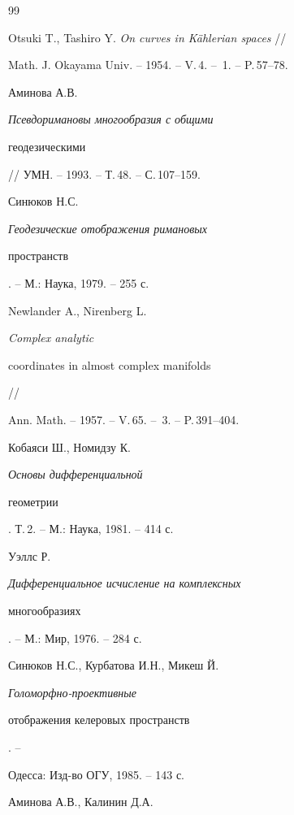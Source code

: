 \begin{thebibliography}{99}


Otsuki T., Tashiro Y. {\em On curves in K\"ahlerian spaces} //


Math. J. Okayama Univ. -- 1954. -- V.\,4. -- \No\,1. -- P.\,57--78.







Аминова А.В. {\em Псевдоримановы многообразия с общими


геодезическими} // УМН. -- 1993. -- Т.\,48. -- С.\,107--159.







Синюков Н.С. {\em Геодезические отображения римановых


пространств}. -- М.: Наука, 1979. -- 255 с.







Newlander A., Nirenberg L. {\em Complex analytic


coordinates in almost complex manifolds} //


Ann. Math. -- 1957. -- V.\,65. -- \No\,3. -- P.\,391--404.







Кобаяси Ш., Номидзу К. {\em Основы дифференциальной


геометрии}. Т.\,2. -- М.: Наука, 1981. -- 414 с.







Уэллс Р. {\em Дифференциальное исчисление на комплексных


многообразиях}. -- М.: Мир, 1976. -- 284 с.







Синюков Н.С., Курбатова И.Н., Микеш Й.


{\em Голоморфно-проективные


отображения келеровых пространств}. --


Одесса: Изд-во ОГУ, 1985. -- 143 с.







Аминова А.В., Калинин Д.А.



\end{thebibliography}
